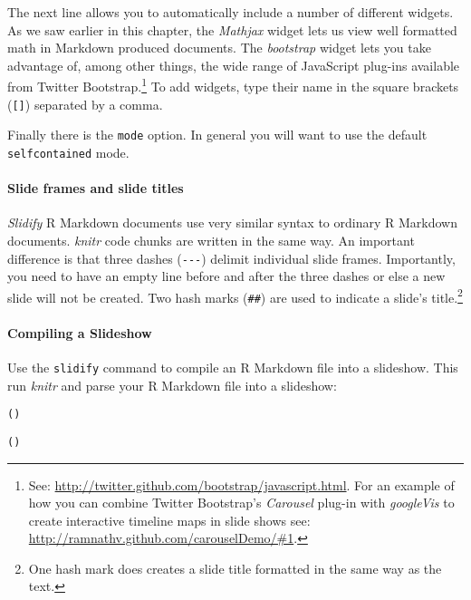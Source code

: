 The next line allows you to automatically include a number of different widgets. As we saw earlier in this chapter, the \emph{Mathjax} widget lets us view well formatted math in Markdown produced documents. The \emph{bootstrap} widget lets you take advantage of, among other things, the wide range of JavaScript plug-ins available from Twitter Bootstrap.\footnote{See: \url{http://twitter.github.com/bootstrap/javascript.html}. For an example of how you can combine Twitter Bootstrap's \emph{Carousel} plug-in with \emph{googleVis} to create interactive timeline maps in slide shows see: \url{http://ramnathv.github.com/carouselDemo/#1}.} To add widgets, type their name in the square brackets (\verb|[]|) separated by a comma.

Finally there is the \texttt{mode} option. In general you will want to use the default \texttt{selfcontained} mode.

\paragraph{Slide frames and slide titles}

\emph{Slidify} R Markdown documents use very similar syntax to ordinary R Markdown documents. \emph{knitr} code chunks are written in the same way. An important difference is that three dashes (\verb|---|) delimit individual slide frames. Importantly, you need to have an empty line before and after the three dashes or else a new slide will not be created. Two hash marks (\verb|##|) are used to indicate a slide's title.\footnote{One hash mark does creates a slide title formatted in the same way as the text.} 

\paragraph{Compiling a Slideshow}

Use the \verb|slidify| command to compile an R Markdown file into a slideshow. This run \emph{knitr} and parse your R Markdown file into a slideshow:

\begin{knitrout}
\color{fgcolor}\begin{kframe}
\begin{alltt}
()

()
\end{alltt}
\end{kframe}
\end{knitrout}


